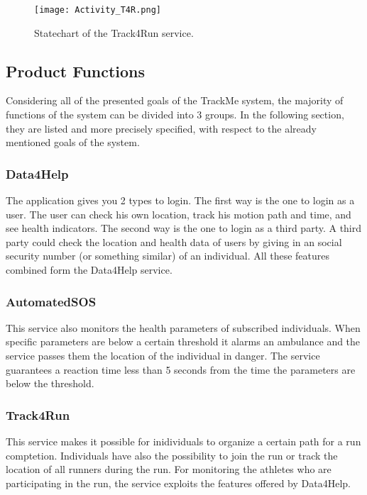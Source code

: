 \documentclass[12pt]{article}
\begin{document}
\begin{figure}[H]
\centering
\texttt{[image: Activity\_T4R.png]}
\label{fig:Activity_T4R}
\caption{Statechart of the Track4Run service.}
\end{figure}

\subsection{Product Functions}
Considering all of the presented goals of the TrackMe system, the majority of functions of the system can be divided into 3 groups. In the following section, they are listed and more precisely specified, with respect to the already mentioned goals of the system.
\subsubsection{Data4Help}
The application gives you 2 types to login. The first way is the one to login as a user. The user can check his own location, track his motion path and time, and see health indicators. The second way is the one to login as a third party. A third party could check the location and health data of users by giving in an social security number (or something similar) of an individual. All these features combined form the Data4Help service.
\subsubsection{AutomatedSOS} This service also monitors the health parameters of subscribed individuals. When specific parameters are below a certain threshold it alarms an ambulance and the service passes them the location of the individual in danger. The service guarantees a reaction time less than 5 seconds from the time the parameters are below the threshold.
\subsubsection{Track4Run}
This service makes it possible for inidividuals to organize a certain path for a run comptetion. Individuals have also the possibility to join the run or track the location of all runners during the run. For monitoring the athletes who are participating in the run, the service exploits the features offered by Data4Help. 
\end{document}
